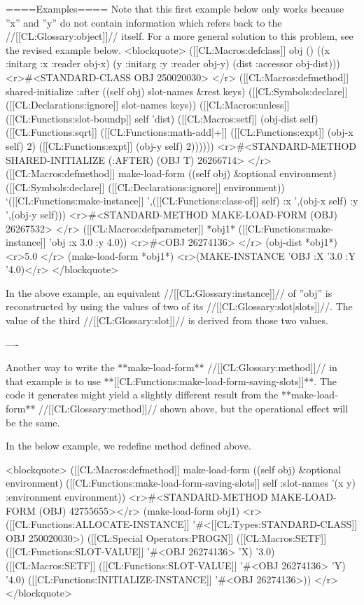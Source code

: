 ====Examples====
Note that this first example below only works because ''x'' and ''y'' do not contain information which refers back to the //[[CL:Glossary:object]]// itself. For a more general solution to this problem, see the revised example below. 
<blockquote>
([[CL:Macros:defclass]] obj () 
  ((x :initarg :x :reader obj-x) 
   (y :initarg :y :reader obj-y) 
   (dist :accessor obj-dist))) <r>#<STANDARD-CLASS OBJ 250020030> </r>
([[CL:Macros:defmethod]] shared-initialize :after ((self obj) slot-names &rest keys) 
  ([[CL:Symbols:declare]] ([[CL:Declarations:ignore]] slot-names keys)) 
  ([[CL:Macros:unless]] ([[CL:Functions:slot-boundp]] self 'dist) 
    ([[CL:Macros:setf]] (obj-dist self) ([[CL:Functions:sqrt]] ([[CL:Functions:math-add|+]] ([[CL:Functions:expt]] (obj-x self) 2) ([[CL:Functions:expt]] (obj-y self) 2))))))
<r>#<STANDARD-METHOD SHARED-INITIALIZE (:AFTER) (OBJ T) 26266714> </r>
([[CL:Macros:defmethod]] make-load-form ((self obj) &optional environment) 
  ([[CL:Symbols:declare]] ([[CL:Declarations:ignore]] environment)) 
  `([[CL:Functions:make-instance]] ',([[CL:Functions:class-of]] self) :x ',(obj-x self) :y ',(obj-y self))) 
<r>#<STANDARD-METHOD MAKE-LOAD-FORM (OBJ) 26267532> </r>
([[CL:Macros:defparameter]] *obj1* ([[CL:Functions:make-instance]] 'obj :x 3.0 :y 4.0)) <r>#<OBJ 26274136> </r>
(obj-dist *obj1*) <r>5.0 </r>
(make-load-form *obj1*) <r>(MAKE-INSTANCE 'OBJ :X '3.0 :Y '4.0)</r>
</blockquote>

In the above example, an equivalent //[[CL:Glossary:instance]]// of ''obj'' is reconstructed by using the values of two of its //[[CL:Glossary:slot|slots]]//. The value of the third //[[CL:Glossary:slot]]// is derived from those two values.

----

Another way to write the **make-load-form** //[[CL:Glossary:method]]// in that example is to use **[[CL:Functions:make-load-form-saving-slots]]**. The code it generates might yield a slightly different result from the **make-load-form** //[[CL:Glossary:method]]// shown above, but the operational effect will be the same. 

In the below example, we redefine method defined above.

<blockquote>
([[CL:Macros:defmethod]] make-load-form ((self obj) &optional environment)
  ([[CL:Functions:make-load-form-saving-slots]] self :slot-names '(x y) :environment environment)) 
<r>#<STANDARD-METHOD MAKE-LOAD-FORM (OBJ) 42755655></r>
(make-load-form obj1)
<r>([[CL:Functions:ALLOCATE-INSTANCE]] '#<[[CL:Types:STANDARD-CLASS]] OBJ 250020030>)
([[CL:Special Operators:PROGN]] 
  ([[CL:Macros:SETF]] ([[CL:Functions:SLOT-VALUE]] '#<OBJ 26274136> 'X) '3.0) 
  ([[CL:Macros:SETF]] ([[CL:Functions:SLOT-VALUE]] '#<OBJ 26274136> 'Y) '4.0)
  ([[CL:Functions:INITIALIZE-INSTANCE]] '#<OBJ 26274136>)) </r>
</blockquote>


